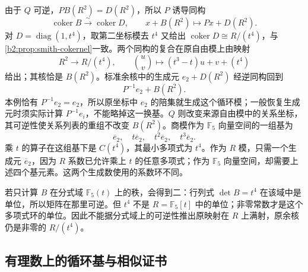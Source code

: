 \ProseParagraphBreak
由于 \(Q\) 可逆，\(PB(R^2)=D(R^2)\)，所以 \(P\) 诱导同构
\[
	\operatorname{coker}B\xrightarrow{\sim}\operatorname{coker}D, \qquad x+B(R^2)\longmapsto Px+D(R^2).
\]
对 \(D=\operatorname{diag}(1,t^4)\)，取第二坐标模去 \(t^4\) 又给出 \(\operatorname{coker}D\cong R/(t^4)\)，与\cref{b2:prop:smith-cokernel}一致。两个同构的复合在原自由模上由映射
\[
	R^2\longrightarrow R/(t^4),\qquad \binom{u}{v}\longmapsto (t^3-t)u+v+(t^4)
\]
给出；其核恰是 \(B(R^2)\)。标准余核中的生成元 \(e_2+D(R^2)\) 经逆同构回到
\[
	P^{-1}e_2+B(R^2).
\]
本例恰有 \(P^{-1}e_2=e_2\)，所以原坐标中 \(e_2\) 的陪集就生成这个循环模；一般恢复生成元时须实际计算 \(P^{-1}e_i\)，不能略掉这一换基。\(Q\) 则改变来源自由模中的关系坐标，其可逆性使关系列表的重组不改变 \(B(R^2)\)。商模作为 \(\mathbb F_5\) 向量空间的一组基为
\[
	\overline e_2,\quad t\overline e_2,\quad t^2\overline e_2,\quad t^3\overline e_2.
\]
乘 \(t\) 的算子在这组基下是 \(C(t^4)\)，其最小多项式为 \(t^4\)。作为 \(R\) 模，只需一个生成元 \(\overline e_2\)，因为 \(R\) 系数已允许乘上 \(t\) 的任意多项式；作为 \(\mathbb F_5\) 向量空间，却需要上述四个基元素。这两个生成数使用的系数环不同。

\ProseParagraphBreak
若只计算 \(B\) 在分式域 \(\mathbb F_5(t)\) 上的秩，会得到二：行列式 \(\det B=t^4\) 在该域中是单位，所以矩阵在那里可逆。但 \(t^4\) 不是 \(R=\mathbb F_5[t]\) 中的单位；非零常数才是这个多项式环的单位。因此不能据分式域上的可逆性推出原映射在 \(R\) 上满射，原余核仍是非零的 \(R/(t^4)\)。

\subsection{有理数上的循环基与相似证书}
\label{b2:subsec:A04:02}

